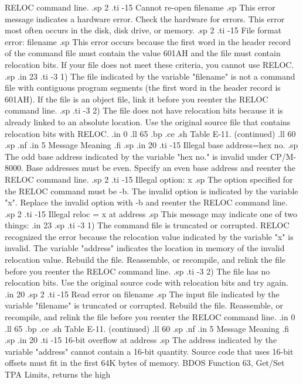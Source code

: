 RELOC command line.
.sp 2
.ti -15
Cannot re-open  filename
.sp
This error message indicates a hardware error.  Check the hardware for 
errors.  This error most often occurs in the disk, disk drive, or memory.
.sp 2
.ti -15
File format error:  filename
.sp
This error occurs because the first word in the header record of the 
command file must contain the value 601AH and the file must contain 
relocation bits.  If your file does not meet these criteria, you cannot use 
RELOC.
.sp
.in 23
.ti -3
1) The file indicated by the variable "filename" is not a command file with
contiguous program segments (the first word in the header record is 
601AH).  If the file is an object file, link it before you reenter the RELOC
command line.
.sp
.ti -3
2) The file does not have relocation bits because it is already linked 
to an absolute location.  Use the original source file that contains 
relocation bits with RELOC.
.in 0
.ll 65
.bp
.ce
.sh
Table E-11.  (continued)
.ll 60
.sp
.nf
.in 5
Message        Meaning
.fi
.sp
.in 20
.ti -15
Illegal base address=hex no.
.sp
The odd base address indicated by the variable "hex no." is invalid 
under CP/M-8000.  Base addresses must be even.  Specify an even base address 
and reenter the RELOC command line.
.sp 2
.ti -15
Illegal option:  x
.sp
The option specified for the RELOC command must be -b.  The invalid
option is indicated by the variable "x".  Replace the invalid option with -b 
and reenter the RELOC command line.
.sp 2
.ti -15
Illegal reloc = x at address
.sp
This message may indicate one of two things:
.in 23
.sp
.ti -3
1) The command file is truncated or corrupted.  RELOC recognized the
error because the relocation value indicated by the variable "x" is invalid.  
The variable "address" indicates the location in memory of the invalid 
relocation value.  Rebuild the file.  Reassemble, or recompile, and relink 
the file before you reenter the RELOC command line.
.sp
.ti -3
2) The file has no relocation bits.  Use the original source code with 
relocation bits and try again.
.in 20
.sp 2
.ti -15
Read error on filename
.sp
The input file indicated by the variable "filename" is truncated or 
corrupted.  Rebuild the file.  Reassemble, or recompile, and relink 
the file before you reenter the RELOC command line.
.in 0
.ll 65
.bp
.ce
.sh
Table E-11.  (continued)
.ll 60
.sp
.nf
.in 5
Message        Meaning
.fi
.sp
.in 20
.ti -15
16-bit overflow at address
.sp
The address indicated by the variable "address" cannot contain a
16-bit quantity.  Source code that uses 16-bit offsets must fit in the first 
64K bytes of memory.  BDOS Function 63, Get/Set TPA Limits, returns the high
